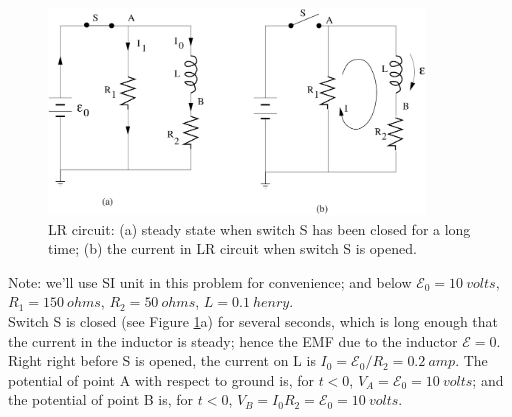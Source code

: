 \documentclass[makesolutionspdf]{esg8022pset}
\begin{document}
\begin{solution}
  \begin{figure}[H]
    \centering
    \includegraphics[width = 10cm]{inductance2}
    \caption{LR circuit: (a) steady state when switch S has been closed for a
      long time; (b) the current in LR circuit when switch S is opened.}
    \label{fig:inductance2.eps}
  \end{figure}

  Note: we'll use SI unit in this problem for convenience; and below
  ${\mathcal{E}}_0=10\:volts$, $R_1=150\:ohms$, $R_2=50\:ohms$,
  $L=0.1\:henry$.\\

  Switch S is closed (see Figure \ref{fig:inductance2.eps}a) for several
  seconds, which is long enough that the current in the inductor is
  steady; hence the EMF due to the inductor ${\mathcal{E}}=0$.  Right
  right before S is opened, the current on L is $I_0 =
  {\mathcal{E}}_0/R_2 = 0.2\:amp$.  The potential of point A with
  respect to ground is, for $t<0$, $V_A = {\mathcal{E}}_0 = 10\:volts$;
  and the potential of point B is, for $t<0$, $V_B=I_0 R_2=
  {\mathcal{E}}_0=10\:volts$.\\


\end{solution}
\end{document}
